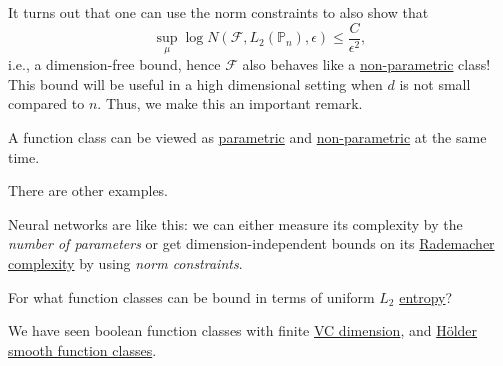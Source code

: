 It turns out that one can use the norm constraints to also show that
\[
	\sup _\mu \log N(\mathscr{F} , L_2(\mathbb{P} _n), \epsilon ) \leq \frac{C}{\epsilon ^2},
\]
i.e., a dimension-free bound, hence \(\mathscr{F} \) also behaves like a \hyperref[def:non-parametric]{non-parametric} class! This bound will be useful in a high dimensional setting when \(d\) is not small compared to \(n\). Thus, we make this an important remark.

\begin{remark}
	A function class can be viewed as \hyperref[def:parametric]{parametric} and \hyperref[def:non-parametric]{non-parametric} at the same time.
\end{remark}

There are other examples.

\begin{eg}
	Neural networks are like this: we can either measure its complexity by the \emph{number of parameters} or get dimension-independent bounds on its \hyperref[def:Rademacher-complexity]{Rademacher complexity} by using \emph{norm constraints}.
\end{eg}

\begin{problem*}
	For what function classes can be bound in terms of uniform \(L_2\) \hyperref[def:metric-entropy]{entropy}?
\end{problem*}
\begin{answer}
	We have seen boolean function classes with finite \hyperref[def:VC-dimension]{VC dimension}, and \hyperref[def:Holder-smooth-function-class]{Hölder smooth function classes}.
\end{answer}
